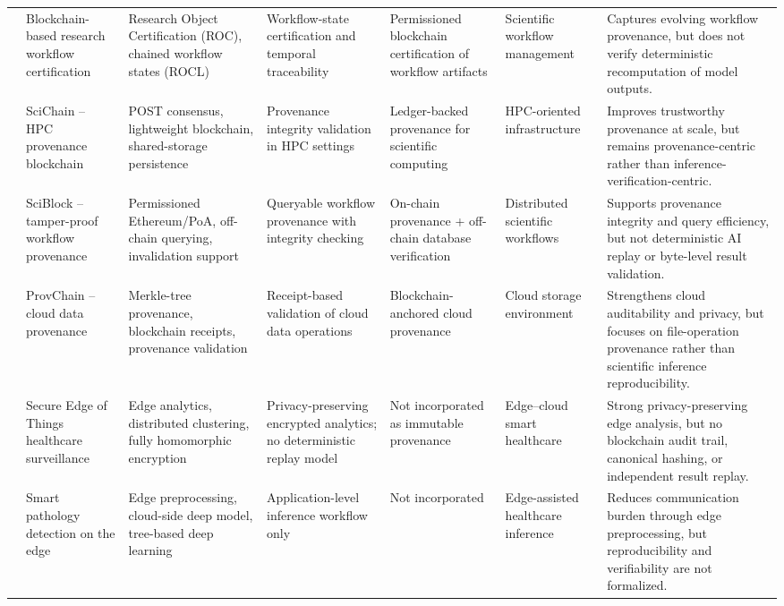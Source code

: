 \documentclass[conference]{IEEEtran}
\begin{document}
\begin{table}[!htbp]
{\begin{tabular}{p{1.5cm} p{3.5cm} p{3.5cm} p{2.4cm} p{2.9cm} p{2.9cm} p{3.8cm}}
\cite{wittek2021blockchain} & Blockchain-based research workflow certification & Research Object Certification (ROC), chained workflow states (ROCL) & Workflow-state certification and temporal traceability & Permissioned blockchain certification of workflow artifacts & Scientific workflow management & Captures evolving workflow provenance, but does not verify deterministic recomputation of model outputs. \\

\cite{al2021scichain} & SciChain -- HPC provenance blockchain & POST consensus, lightweight blockchain, shared-storage persistence & Provenance integrity validation in HPC settings & Ledger-backed provenance for scientific computing & HPC-oriented infrastructure & Improves trustworthy provenance at scale, but remains provenance-centric rather than inference-verification-centric. \\

\cite{fernando2019sciblock} & SciBlock -- tamper-proof workflow provenance & Permissioned Ethereum/PoA, off-chain querying, invalidation support & Queryable workflow provenance with integrity checking & On-chain provenance + off-chain database verification & Distributed scientific workflows & Supports provenance integrity and query efficiency, but not deterministic AI replay or byte-level result validation. \\

\cite{liang2017provchain} & ProvChain -- cloud data provenance & Merkle-tree provenance, blockchain receipts, provenance validation & Receipt-based validation of cloud data operations & Blockchain-anchored cloud provenance & Cloud storage environment & Strengthens cloud auditability and privacy, but focuses on file-operation provenance rather than scientific inference reproducibility. \\

\cite{alabdulatif2019secure} & Secure Edge of Things healthcare surveillance & Edge analytics, distributed clustering, fully homomorphic encryption & Privacy-preserving encrypted analytics; no deterministic replay model & Not incorporated as immutable provenance & Edge--cloud smart healthcare & Strong privacy-preserving edge analysis, but no blockchain audit trail, canonical hashing, or independent result replay. \\

 \cite{muhammad2019computing} & Smart pathology detection on the edge & Edge preprocessing, cloud-side deep model, tree-based deep learning & Application-level inference workflow only & Not incorporated & Edge-assisted healthcare inference & Reduces communication burden through edge preprocessing, but reproducibility and verifiability are not formalized. \\


\end{tabular}}
\end{table}
\end{document}
